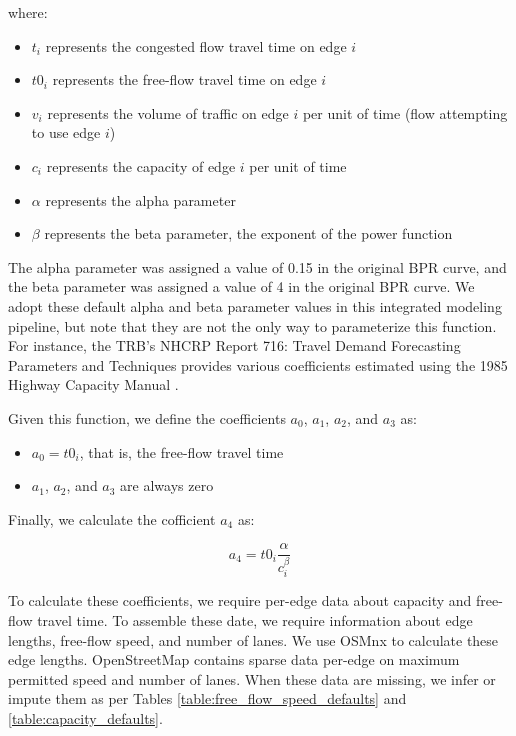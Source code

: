 \bigskip
where:

\bigskip
\begin{itemize}
    \item $t_i$ represents the congested flow travel time on edge $i$
    \item $t0_i$ represents the free-flow travel time on edge $i$
    \item $v_i$ represents the volume of traffic on edge $i$ per unit of time (flow attempting to use edge $i$)
    \item $c_i$ represents the capacity of edge $i$ per unit of time
    \item $\alpha$ represents the alpha parameter
    \item $\beta$ represents the beta parameter, the exponent of the power function
\end{itemize}

\bigskip
The alpha parameter was assigned a value of 0.15 in the original BPR curve, and the beta parameter was assigned a value of 4 in the original BPR curve. We adopt these default alpha and beta parameter values in this integrated modeling pipeline, but note that they are not the only way to parameterize this function. For instance, the TRB's NHCRP Report 716: Travel Demand Forecasting Parameters and Techniques provides various coefficients estimated using the 1985 Highway Capacity Manual \citep[p.~75]{transportation_research_board_highway_1985,transportation_research_board_travel_2012}.

\bigskip
Given this function, we define the coefficients $a_0$, $a_1$, $a_2$, and $a_3$ as:

\bigskip
\begin{itemize}
    \item $a_0 = t0_i$, that is, the free-flow travel time
    \item $a_1$, $a_2$, and $a_3$ are always zero
\end{itemize}

\bigskip
Finally, we calculate the cofficient $a_4$ as:

\begin{equation}
    a_4 = t0_i \frac{\alpha}{c_i ^ {\beta}}
    \label{eq:bpr_a4_coefficient}
\end{equation}

To calculate these coefficients, we require per-edge data about capacity and free-flow travel time. To assemble these date, we require information about edge lengths, free-flow speed, and number of lanes. We use OSMnx to calculate these edge lengths. OpenStreetMap contains sparse data per-edge on maximum permitted speed and number of lanes. When these data are missing, we infer or impute them as per Tables \ref{table:free_flow_speed_defaults} and \ref{table:capacity_defaults}.

